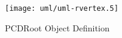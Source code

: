 \begin{figure}[htp]
  \begin{center}
    \texttt{[image: uml/uml-rvertex.5]}

    \caption{PCDRoot Object Definition}
    \label{fig:pcd-node-class}
  \end{center}
\end{figure}